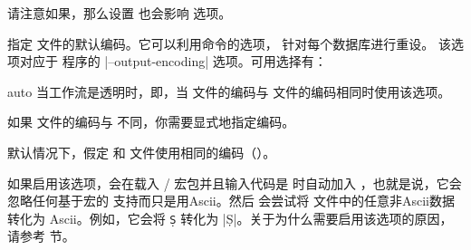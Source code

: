 \begin{optionlist}
\begin{valuelist}
\end{valuelist}
%
请注意如果，那么设置  也会影响  选项。


指定  文件的默认编码。它可以利用命令的选项，
针对每个数据库进行重设。
该选项对应于 \biber 程序的 |--output-encoding| 选项。可用选择有：

\begin{valuelist}

\item[auto] %
当工作流是透明时，即，当  文件的编码与  文件的编码相同时使用该选项。

\item[\prm{encoding}] %
如果  文件的编码与  不同，你需要显式地指定编码。

\end{valuelist}

默认情况下，\biblatex 假定  和  文件使用相同的编码（）。


如果启用该选项，\biblatex 会在载入 \slash {} 宏包并且输入代码是 \utf 时自动加入 ，也就是说，它会忽略任何基于宏的 \utf 支持而只是用Ascii。然后 \biber 会尝试将  文件中的任意非Ascii数据转化为 Ascii。例如，它会将 \texttt{\d{S}} 转化为 |\d{S}|。关于为什么需要启用该选项的原因，请参考  节。


\end{optionlist}
